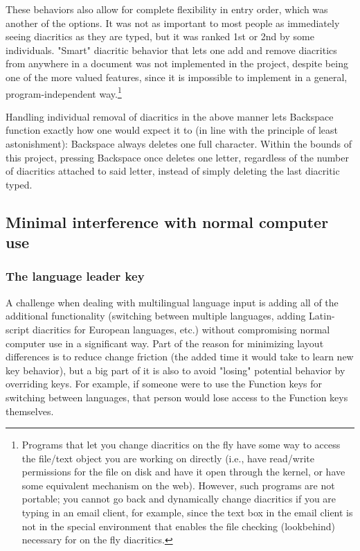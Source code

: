 \documentclass[11pt]{article}
\begin{document}
These behaviors also allow for complete flexibility in entry order, which was another of the options. It was not as important to most people as immediately seeing diacritics as they are typed, but it was ranked 1st or 2nd by some individuals. "Smart" diacritic behavior that lets one add and remove diacritics from anywhere in a document was not implemented in the project, despite being one of the more valued features, since it is impossible to implement in a general, program-independent way.\footnote{Programs that let you change diacritics on the fly have some way to access the file/text object you are working on directly (i.e., have read/write permissions for the file on disk and have it open through the kernel, or have some equivalent mechanism on the web). However, such programs are not portable; you cannot go back and dynamically change diacritics if you are typing in an email client, for example, since the text box in the email client is not in the special environment that enables the file checking (lookbehind) necessary for on the fly diacritics.}

Handling individual removal of diacritics in the above manner lets Backspace function exactly how one would expect it to (in line with the principle of least astonishment): Backspace always deletes one full character. Within the bounds of this project, pressing Backspace once deletes one letter, regardless of the number of diacritics attached to said letter, instead of simply deleting the last diacritic typed.

\subsection{Minimal interference with normal computer use}
\label{sec:orga7185aa}

\subsubsection{The language leader key}
\label{sec:orgb1f35b2}

A challenge when dealing with multilingual language input is adding all of the additional functionality (switching between multiple languages, adding Latin-script diacritics for European languages, etc.) without compromising normal computer use in a significant way. Part of the reason for minimizing layout differences is to reduce change friction (the added time it would take to learn new key behavior), but a big part of it is also to avoid "losing" potential behavior by overriding keys. For example, if someone were to use the Function keys for switching between languages, that person would lose access to the Function keys themselves.
\end{document}
